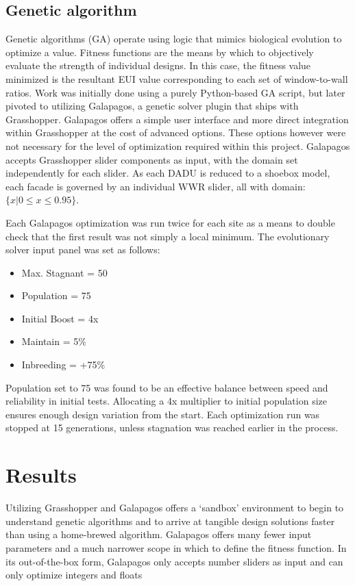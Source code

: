 \documentclass[sagev,times,Royal]{sagej}
\begin{document}
\subsection{Genetic algorithm}
Genetic algorithms (GA) operate using logic that mimics biological evolution to optimize a value. Fitness functions are the means by which to objectively evaluate the strength of individual designs. In this case, the fitness value minimized is the resultant EUI value corresponding to each set of window-to-wall ratios. Work was initially done using a purely Python-based GA script, but later pivoted to utilizing Galapagos, a genetic solver plugin that ships with Grasshopper. Galapagos offers a simple user interface and more direct integration within Grasshopper at the cost of advanced options. These options however were not necessary for the level of optimization required within this project. Galapagos accepts Grasshopper slider components as input, with the domain set independently for each slider. As each DADU is reduced to a shoebox model, each facade is governed by an individual WWR slider, all with domain: $\lbrace x \vert 0 \leq x \leq 0.95 \rbrace$. 

Each Galapagos optimization was run twice for each site as a means to double check that the first result was not simply a local minimum. The evolutionary solver input panel was set as follows: 

\begin{itemize}
	\item Max. Stagnant = 50
	\item Population = 75
	\item Initial Boost = 4x
	\item Maintain = 5\%
	\item Inbreeding = +75\%
\label{galapagos-settings}
\end{itemize}

Population set to 75 was found to be an effective balance between speed and reliability in initial tests. Allocating a 4x multiplier to initial population size ensures enough design variation from the start. Each optimization run was stopped at 15 generations, unless stagnation was reached earlier in the process.  

\section{Results}
Utilizing Grasshopper and Galapagos offers a ‘sandbox’ environment to begin to understand genetic algorithms and to arrive at tangible design solutions faster than using a home-brewed algorithm. Galapagos offers many fewer input parameters and a much narrower scope in which to define the fitness function. In its out-of-the-box form, Galapagos only accepts number sliders as input and can only optimize integers and floats
\end{document}
